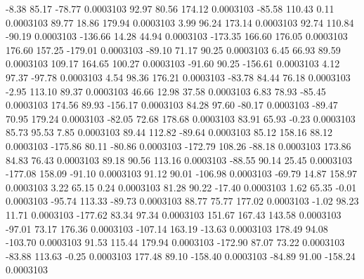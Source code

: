        -8.38       85.17      -78.77     0.0003103
       92.97       80.56      174.12     0.0003103
      -85.58      110.43        0.11     0.0003103
       89.77       18.86      179.94     0.0003103
        3.99       96.24      173.14     0.0003103
       92.74      110.84      -90.19     0.0003103
     -136.66       14.28       44.94     0.0003103
     -173.35      166.60      176.05     0.0003103
      176.60      157.25     -179.01     0.0003103
      -89.10       71.17       90.25     0.0003103
        6.45       66.93       89.59     0.0003103
      109.17      164.65      100.27     0.0003103
      -91.60       90.25     -156.61     0.0003103
        4.12       97.37      -97.78     0.0003103
        4.54       98.36      176.21     0.0003103
      -83.78       84.44       76.18     0.0003103
       -2.95      113.10       89.37     0.0003103
       46.66       12.98       37.58     0.0003103
        6.83       78.93      -85.45     0.0003103
      174.56       89.93     -156.17     0.0003103
       84.28       97.60      -80.17     0.0003103
      -89.47       70.95      179.24     0.0003103
      -82.05       72.68      178.68     0.0003103
       83.91       65.93       -0.23     0.0003103
       85.73       95.53        7.85     0.0003103
       89.44      112.82      -89.64     0.0003103
       85.12      158.16       88.12     0.0003103
     -175.86       80.11      -80.86     0.0003103
     -172.79      108.26      -88.18     0.0003103
      173.86       84.83       76.43     0.0003103
       89.18       90.56      113.16     0.0003103
      -88.55       90.14       25.45     0.0003103
     -177.08      158.09      -91.10     0.0003103
       91.12       90.01     -106.98     0.0003103
      -69.79       14.87      158.97     0.0003103
        3.22       65.15        0.24     0.0003103
       81.28       90.22      -17.40     0.0003103
        1.62       65.35       -0.01     0.0003103
      -95.74      113.33      -89.73     0.0003103
       88.77       75.77      177.02     0.0003103
       -1.02       98.23       11.71     0.0003103
     -177.62       83.34       97.34     0.0003103
      151.67      167.43      143.58     0.0003103
      -97.01       73.17      176.36     0.0003103
     -107.14      163.19      -13.63     0.0003103
      178.49       94.08     -103.70     0.0003103
       91.53      115.44      179.94     0.0003103
     -172.90       87.07       73.22     0.0003103
      -83.88      113.63       -0.25     0.0003103
      177.48       89.10     -158.40     0.0003103
      -84.89       91.00     -158.24     0.0003103
